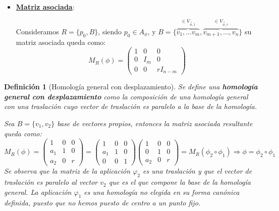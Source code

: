 \documentclass[10pt,a4paper,openright]{book}
\theoremstyle{break}
\newtheorem*{defi}{Definición}
\begin{document}
\begin{itemize}
\item \underline{\textbf{Matriz asociada}}:

Consideramos $R = \{p_0, B\}$, siendo $p_0 \in A_\phi$, y $B = \{\overbrace{v_1, \ldots v_m}^{\in V_{\vec{\phi}, 1}}, \overbrace{v_{m+1}, \ldots, v_n}^{\in V_{\vec{\phi}, r}}\}$ su matriz asociada queda como:
$$M_{R} (\phi) = \left(\begin{array}{c|cc}
1  & 0 & 0 \\
\hline
0  & I_m & 0 \\
0 & 0 & rI_{n-m}
\end{array}
\right)$$
\end{itemize}

\begin{defi}[Homología general con desplazamiento]
Se define una \textbf{homología general con desplazamiento} como la composición de una homología general con una traslación cuyo vector de traslación es paralelo a la base de la homología.

Sea $B = \{v_1, v_2\}$ base de vectores propios, entonces la matriz asociada resultante queda como:
$$M_R (\phi) = \begin{pmatrix} 1 & 0 & 0 \\ a_1 & 1 & 0 \\ a_2 & 0 & r \end{pmatrix} = \left(\begin{array}{c|cc}
1  & 0 & 0 \\
\hline
a_1 & 1 &  0 \\
0 & 0 &  1
\end{array}
\right) \left(\begin{array}{c|cc}
1  & 0 & 0 \\
\hline
0 & 1 &  0 \\
a_2 & 0 &  r
\end{array}
\right) = M_R (\phi_2 \circ \phi_1) \Rightarrow \phi = \phi_2 \circ \phi_1 $$
Se observa que la matriz de la aplicación $\varphi_2$ es una traslación y que el vector de traslación es paralelo al vector $v_2$ que es el que compone la base de la homología general. La aplicación $\varphi_1$ es una homología no elegida en su forma canónica definida, puesto que no hemos puesto de centro a un punto fijo.
\end{defi}
\end{document}
